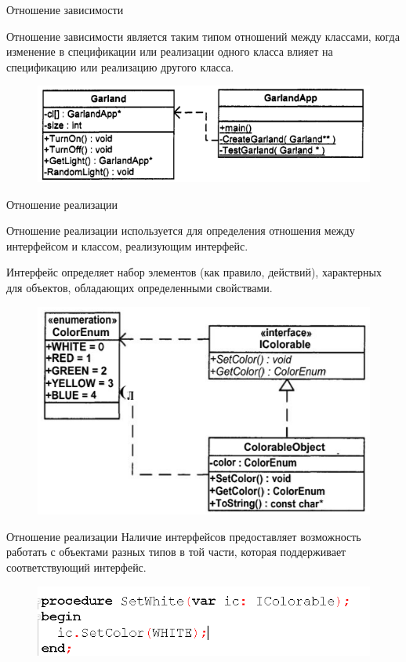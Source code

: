 \documentclass{beamer}
\begin{document}
\begin{frame}{Отношение зависимости}
\begin{block}{Отношение зависимости}
является таким типом отношений между классами, когда изменение в спецификации или реализации одного класса влияет на спецификацию или реализацию другого класса.
\end{block}
\begin{figure}[h]
\centering
\includegraphics[scale=0.6]{images/lec04-pic18.png}
\end{figure}
\end{frame}

\begin{frame}{Отношение реализации}
\begin{block}{Отношение реализации}
используется для определения отношения между интерфейсом и классом, реализующим интерфейс.
\end{block}
Интерфейс определяет набор элементов (как правило, действий), характерных для объектов, обладающих определенными свойствами.
\begin{figure}[h]
\centering
\includegraphics[scale=0.6]{images/lec04-pic19.png}
\end{figure}
\end{frame}

\begin{frame}{Отношение реализации}
Наличие интерфейсов предоставляет возможность работать с объектами разных типов в той части, которая поддерживает соответствующий интерфейс.
\begin{figure}[h]
\centering
\includegraphics[scale=0.75]{images/lec04-pic20.png}
\end{figure}
\end{frame}
\end{document}
